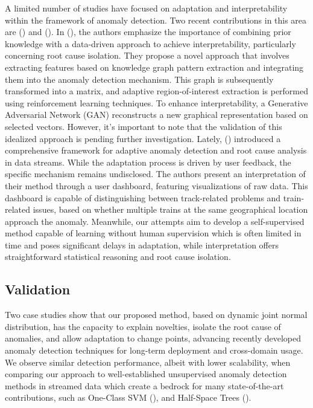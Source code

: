 A limited number of studies have focused on adaptation and interpretability within the framework of anomaly detection. Two recent contributions in this area are (\cite{Steenwinckel2018}) and (\cite{Steenwinckel2021}). In (\cite{Steenwinckel2018}), the authors emphasize the importance of combining prior knowledge with a data-driven approach to achieve interpretability, particularly concerning root cause isolation. They propose a novel approach that involves extracting features based on knowledge graph pattern extraction and integrating them into the anomaly detection mechanism. This graph is subsequently transformed into a matrix, and adaptive region-of-interest extraction is performed using reinforcement learning techniques. To enhance interpretability, a Generative Adversarial Network (GAN) reconstructs a new graphical representation based on selected vectors. However, it's important to note that the validation of this idealized approach is pending further investigation. Lately, (\cite{Steenwinckel2021}) introduced a comprehensive framework for adaptive anomaly detection and root cause analysis in data streams. While the adaptation process is driven by user feedback, the specific mechanism remains undisclosed. The authors present an interpretation of their method through a user dashboard, featuring visualizations of raw data. This dashboard is capable of distinguishing between track-related problems and train-related issues, based on whether multiple trains at the same geographical location approach the anomaly. Meanwhile, our attempts aim to develop a self-supervised method capable of learning without human supervision which is often limited in time and poses significant delays in adaptation, while interpretation offers straightforward statistical reasoning and root cause isolation.

\subsection{Validation}\label{par:validation}
Two case studies show that our proposed method, based on dynamic joint normal distribution, has the capacity to explain novelties, isolate the root cause of anomalies, and allow adaptation to change points, advancing recently developed anomaly detection techniques for long-term deployment and cross-domain usage. We observe similar detection performance, albeit with lower scalability, when comparing our approach to well-established unsupervised anomaly detection methods in streamed data which create a bedrock for many state-of-the-art contributions, such as One-Class SVM (\cite{Amer2013, Liu2014, Krawczyk2015, Miao2019, Gozuacik2021}), and Half-Space Trees (\cite{Wetzig2019, Lyu2020}).

